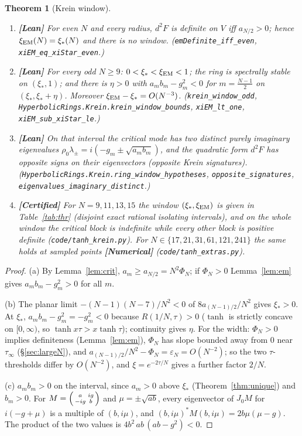 \documentclass[11pt]{article}
\newtheorem{theorem}{Theorem}[section]
\theoremstyle{definition}
\theoremstyle{remark}
\newcommand{\st}[1]{\textbf{[#1]}}
\newcommand{\lean}[1]{\nolinkurl{#1}}
\begin{document}
\begin{theorem}[Krein window]\label{thm:krein}
\begin{enumerate}
\item[(a)] \st{Lean} For even $N$ and every radius, $d^2F$ is definite on $V$ iff $a_{N/2}>0$; hence $\xi_{\rm EM}(N)=\xi_*(N)$
and there is no window. (\lean{emDefinite_iff_even}, \lean{xiEM_eq_xiStar_even}.)
\item[(b)] \st{Lean} For every odd $N\ge9$: $0<\xi_*<\xi_{\rm EM}<1$; the ring is spectrally stable on $(\xi_*,1)$; and there is
$\eta>0$ with $a_mb_m-g_m^2<0$ for $m=\frac{N-1}2$ on $(\xi_*,\xi_*+\eta)$. Moreover $\xi_{\rm EM}-\xi_*=O(N^{-3})$.
(\lean{krein_window_odd}, \lean{HyperbolicRings.Krein.krein_window_bounds}, \lean{xiEM_lt_one},
\lean{xiEM_sub_xiStar_le}.)
\item[(c)] \st{Lean} On that interval the critical mode has two distinct purely imaginary eigenvalues
$\rho_0\lambda_\pm=i(-g_m\pm\sqrt{a_mb_m})$, and the quadratic form $d^2F$ has opposite signs on their eigenvectors (opposite
Krein signatures). (\lean{HyperbolicRings.Krein.ring_window_hypotheses}, \lean{opposite_signatures},
\lean{eigenvalues_imaginary_distinct}.)
\item[(d)] \st{Certified} For $N=9,11,13,15$ the window $(\xi_*,\xi_{\rm EM})$ is given in Table~\ref{tab:thr} (disjoint exact
rational isolating intervals), and on the whole window the critical block is indefinite while every other block is positive
definite (\nolinkurl{code/tanh_krein.py}). For $N\in\{17,21,31,61,121,241\}$ the same holds at sampled points \st{Numerical}
(\nolinkurl{code/tanh_extras.py}).
\end{enumerate}
\end{theorem}
\begin{proof}
(a) By Lemma~\ref{lem:crit}, $a_m\ge a_{N/2}=N^2\Phi_N$; if $\Phi_N>0$ Lemma~\ref{lem:em} gives $a_mb_m-g_m^2>0$ for all $m$.

(b) The planar limit $-(N-1)(N-7)/N^2<0$ of $8a_{(N-1)/2}/N^2$ gives $\xi_*>0$. At $\xi_*$, $a_mb_m-g_m^2=-g_m^2<0$ because
$R(1/N,\tau)>0$ ($\tanh$ is strictly concave on $[0,\infty)$, so $\tanh x\tau>x\tanh\tau$); continuity gives $\eta$. For the
width: $\Phi_N>0$ implies definiteness (Lemma~\ref{lem:em}), $\Phi_N$ has slope bounded away from $0$ near $\tau_\infty$ (\S\ref{sec:largeN}),
and $a_{(N-1)/2}/N^2-\Phi_N=\varepsilon_N=O(N^{-2})$; so the two $\tau$-thresholds differ by $O(N^{-2})$, and $\xi=e^{-2\tau/N}$
gives a further factor $2/N$.

(c) $a_mb_m>0$ on the interval, since $a_m>0$ above $\xi_*$ (Theorem~\ref{thm:unique}) and $b_m>0$. For
$M=\begin{psmallmatrix}a&ig\\-ig&b\end{psmallmatrix}$ and $\mu=\pm\sqrt{ab}$, every eigenvector of $J_0M$ for $i(-g+\mu)$ is a
multiple of $(b,i\mu)$, and $(b,i\mu)^*M(b,i\mu)=2b\mu(\mu-g)$. The product of the two values is $4b^2\,ab\,(ab-g^2)<0$.
\end{proof}
\end{document}
